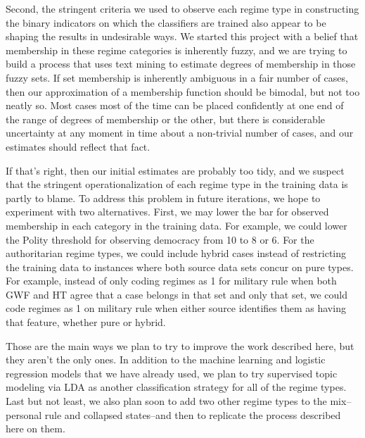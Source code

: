 \documentclass[pdftex,12pt,fullpage,oneside]{amsart}
\begin{document}
Second, the stringent criteria we used to observe each regime type in constructing the binary indicators on which the classifiers are trained also appear to be shaping the results in undesirable ways. We started this project with a belief that membership in these regime categories is inherently fuzzy, and we are trying to build a process that uses text mining to estimate degrees of membership in those fuzzy sets. If set membership is inherently ambiguous in a fair number of cases, then our approximation of a membership function should be bimodal, but not too neatly so. Most cases most of the time can be placed confidently at one end of the range of degrees of membership or the other, but there is considerable uncertainty at any moment in time about a non-trivial number of cases, and our estimates should reflect that fact.

If that's right, then our initial estimates are probably too tidy, and we suspect that the stringent operationalization of each regime type in the training data is partly to blame.  To address this problem in future iterations, we hope to experiment with two alternatives. First, we may lower the bar for observed membership in each category in the training data. For example, we could lower the Polity threshold for observing democracy from 10 to 8 or 6. For the authoritarian regime types, we could include hybrid cases instead of restricting the training data to instances where both source data sets concur on pure types. For example, instead of only coding regimes as 1 for military rule when both GWF and HT agree that a case belongs in that set and only that set, we could code regimes as 1 on military rule when either source identifies them as having that feature, whether pure or hybrid.

Those are the main ways we plan to try to improve the work described here, but they aren't the only ones. In addition to the machine learning and logistic regression models that we have already used, we plan to try supervised topic modeling via LDA as another classification strategy for all of the regime types. Last but not least, we also plan soon to add two other regime types to the mix--personal rule and collapsed states--and then to replicate the process described here on them.



\end{document}

